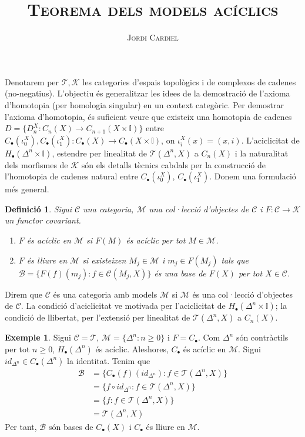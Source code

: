 \documentclass[compress]{article}
\title{\large{\textsc{\textbf{Teorema dels models acíclics}}}}
\author{\textsc{Jordi Cardiel}}
\date{}
\newtheorem{definicio}{Definició}
\theoremstyle{definition}
\newtheorem{exemple}{Exemple}
\begin{document}
\maketitle
Denotarem per $\mathscr{T},\mathscr{K}$ les categories d'espais topològics i de complexos de cadenes (no-negatius). L'objectiu és generalitzar les idees de la demostració de l'axioma d'homotopia (per homologia singular) en un context categòric.\newline
Per demostrar l'axioma d'homotopia, és suficient veure que existeix una homotopia de cadenes $D=\{D_{n}^{X}:C_{n}(X)\rightarrow C_{n+1}(X\times\mathbb{I})\}$ entre $C_{\bullet}(\iota_{0}^{X}),C_{\bullet}(\iota_{1}^{X}):C_{\bullet}(X)\rightarrow C_{\bullet}(X\times\mathbb{I})$, on $\iota_{i}^{X}(x)=(x,i)$. L'aciclicitat de $H_{\bullet}(\Delta^{n}\times\mathbb{I})$, estendre per linealitat de $\mathscr{T}(\Delta^{n},X)$ a $C_{n}(X)$ i la naturalitat dels morfismes de $\mathscr{K}$ són els detalls tècnics cabdals per la construcció de l'homotopia de cadenes natural entre $C_{\bullet}(\iota_{0}^{X})$, $C_{\bullet}(\iota_{1}^{X})$. Donem una formulació més general.
\begin{definicio}
    Sigui $\mathscr{C}$ una categoria, $\mathscr{M}$ una col·lecció  d'objectes de $\mathscr{C}$ i $F:\mathscr{C}\rightarrow\mathscr{K}$ un functor covariant.
    \begin{enumerate}
        \item $F$ és acíclic en $\mathscr{M}$ si $F(M)$ és acíclic per tot $M\in\mathscr{M}$.
        \item $F$ és lliure en $\mathscr{M}$ si existeixen $M_{j}\in\mathscr{M}$ i $m_{j}\in F(M_{j})$ tals que $\mathscr{B}=\{F(f)(m_{j}):f\in\mathscr{C}(M_{j},X)\}$ és una base de $F(X)$ per tot $X\in\mathscr{C}$.
    \end{enumerate}
\end{definicio}
Direm que $\mathscr{C}$ és una categoria amb models $\mathscr{M}$ si $\mathscr{M}$ és una col·lecció d'objectes de $\mathscr{C}$. La condició d'aciclicitat ve motivada per l'aciclicitat de $H_{\bullet}(\Delta^{n}\times\mathbb{I})$; la condició de llibertat, per l'extensió per linealitat de $\mathscr{T}(\Delta^{n},X)$ a $C_{n}(X)$.
\begin{exemple}
    Sigui $\mathscr{C}=\mathscr{T}$, $\mathscr{M}=\{\Delta^{n}:n\geq0\}$ i $F=C_{\bullet}$. Com $\Delta^{n}$ són contràctils per tot $n\geq0$, $H_{\bullet}(\Delta^{n})$ és acíclic. Aleshores, $C_{\bullet}$ és acíclic en $\mathscr{M}$. Sigui $id_{\Delta^{n}}\in C_{\bullet}(\Delta^{n})$ la identitat. Tenim que
    \begin{align*}
        \mathscr{B}
        &=\{C_{\bullet}(f)(id_{\Delta^{n}}): f\in\mathscr{T}(\Delta^{n},X)\}\\
        &=\{f\circ id_{\Delta^{n}}:f\in\mathscr{T}(\Delta^{n},X)\}\\
        &=\{f:f\in\mathscr{T}(\Delta^{n},X)\}\\
        &=\mathscr{T}(\Delta^{n},X)
    \end{align*}
    Per tant, $\mathscr{B}$ són bases de $C_{\bullet}(X)$ i $C_{\bullet}$ és lliure en $\mathscr{M}$.
\end{exemple}
\end{document}
